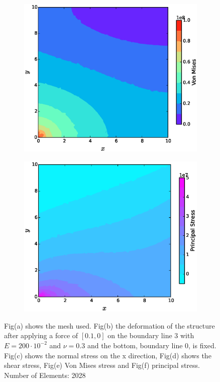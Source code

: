 \documentclass[11pt, a4paper]{article}
\numberwithin{equation}{section}
\begin{document}
\begin{figure}[H]
\begin{subfigure}[H]{0.49\textwidth}
		\caption{}
		\label{fig:1}
	\end{subfigure}
	\begin{subfigure}[H]{0.49\textwidth}
		\includegraphics[width=\textwidth]{fig/ex3_von_mises.eps}
		\caption{}
		\label{fig:2}
	\end{subfigure}
	\begin{subfigure}[H]{0.49\textwidth}
		\includegraphics[width=\textwidth]{fig/ex3_principal_stress.eps}
		\caption{}
		\label{fig:2}
	\end{subfigure}
	\caption{Fig(a) shows the mesh used. Fig(b) the deformation of the structure after applying a force of $[0.1, 0]$ on the boundary line 3 with $E=200 \cdot 10^{-2}$ and $\nu=0.3$ and the bottom, boundary line 0, is fixed. Fig(c) shows the normal stress on the x direction, Fig(d) shows the shear stress, Fig(e) Von Mises stress and Fig(f) principal stress. Number of Elements: 2028}
	\label{fig:3_1}
\end{figure}
\end{document}
